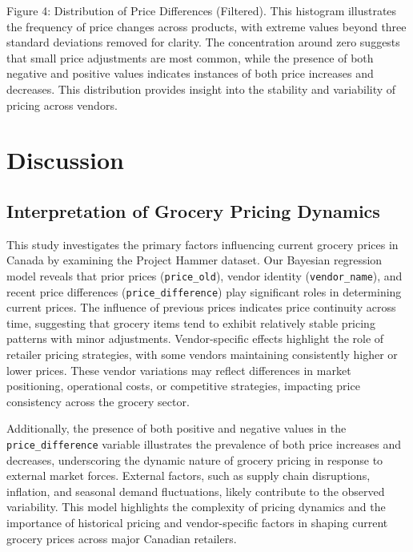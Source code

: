 \documentclass[
  letterpaper,
  DIV=11,
  numbers=noendperiod]{scrartcl}
\begin{document}
Figure 4: Distribution of Price Differences (Filtered). This histogram
illustrates the frequency of price changes across products, with extreme
values beyond three standard deviations removed for clarity. The
concentration around zero suggests that small price adjustments are most
common, while the presence of both negative and positive values
indicates instances of both price increases and decreases. This
distribution provides insight into the stability and variability of
pricing across vendors.

\section{Discussion}\label{discussion}

\subsection{Interpretation of Grocery Pricing
Dynamics}\label{interpretation-of-grocery-pricing-dynamics}

This study investigates the primary factors influencing current grocery
prices in Canada by examining the Project Hammer dataset. Our Bayesian
regression model reveals that prior prices (\texttt{price\_old}), vendor
identity (\texttt{vendor\_name}), and recent price differences
(\texttt{price\_difference}) play significant roles in determining
current prices. The influence of previous prices indicates price
continuity across time, suggesting that grocery items tend to exhibit
relatively stable pricing patterns with minor adjustments.
Vendor-specific effects highlight the role of retailer pricing
strategies, with some vendors maintaining consistently higher or lower
prices. These vendor variations may reflect differences in market
positioning, operational costs, or competitive strategies, impacting
price consistency across the grocery sector.

Additionally, the presence of both positive and negative values in the
\texttt{price\_difference} variable illustrates the prevalence of both
price increases and decreases, underscoring the dynamic nature of
grocery pricing in response to external market forces. External factors,
such as supply chain disruptions, inflation, and seasonal demand
fluctuations, likely contribute to the observed variability. This model
highlights the complexity of pricing dynamics and the importance of
historical pricing and vendor-specific factors in shaping current
grocery prices across major Canadian retailers.
\end{document}
